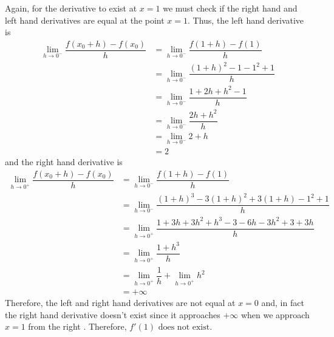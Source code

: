 \documentclass{hwset}
\begin{document}
	\begin{solution}
		Again, for the derivative to exist at $x=1$ we must check if the right hand and
		left hand derivatives are equal at the point $x=1$. Thus, the left hand
		derivative is
		\begin{align*}
			\lim_{h\to 0^-} \dfrac{f(x_0+h) - f(x_0)}{h} &=
				\lim_{h\to 0^-} \dfrac{f(1+h) - f(1)}{h} \\ 
			&=\lim_{h\to 0^-} \dfrac{(1+h)^2 - 1 - 1^2 + 1}{h} \\
			&= \lim_{h\to 0^-} \dfrac{1 + 2h + h^2 - 1}{h} \\
			&= \lim_{h\to 0^-} \dfrac{2h + h^2}{h} \\
			&= \lim_{h\to 0^-} 2 + h \\
			&= 2 
		\end{align*}
		and the right hand derivative is
		\begin{align*}
			\lim_{h\to 0^+} \dfrac{f(x_0+h) - f(x_0)}{h} &= 
				\lim_{h\to 0^-} \dfrac{f(1+h) - f(1)}{h} \\ 
			&= \lim_{h\to 0^-} \dfrac{(1+h)^3 - 3(1 + h)^2 + 3(1 + h) - 1^2 + 1}{h} \\
			&= \lim_{h\to 0^+} \dfrac{1 + 3h + 3h^2 + h^3 - 3 - 6h - 3h^2 + 3 + 3h}{h} \\
			&= \lim_{h\to 0^+} \dfrac{1 + h^3}{h} \\
			&= \lim_{h\to 0^+} \dfrac{1}{h} + \lim_{h\to 0^+} h^2 \\
			&= +\infty 
		\end{align*}
		Therefore, the left and right hand derivatives are not equal at $x=0$ and,
		in fact the right hand derivative doesn't exist since it approaches
		$+\infty$ when we approach $x=1$ from the right . Therefore, $\boxed{f'(1) \text{ does not exist.}}$
	\end{solution}
\ee
\end{document}
